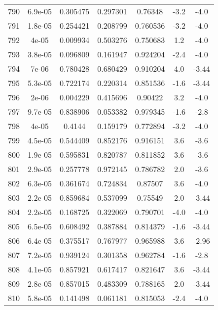 \begin{table}
\begin{tabular}{c|c|c|c|c|c|c}
790 & 6.9e-05 & 0.305475 & 0.297301 & 0.76348 & -3.2 & -4.0\\
791 & 1.8e-05 & 0.254421 & 0.208799 & 0.760536 & -3.2 & -4.0\\
792 & 4e-05 & 0.009934 & 0.503276 & 0.750683 & 1.2 & -4.0\\
793 & 3.8e-05 & 0.096809 & 0.161947 & 0.924204 & -2.4 & -4.0\\
794 & 7e-06 & 0.780428 & 0.680429 & 0.910204 & 4.0 & -3.44\\
795 & 5.3e-05 & 0.722174 & 0.220314 & 0.851536 & -1.6 & -3.44\\
796 & 2e-06 & 0.004229 & 0.415696 & 0.90422 & 3.2 & -4.0\\
797 & 9.7e-05 & 0.838906 & 0.053382 & 0.979345 & -1.6 & -2.8\\
798 & 4e-05 & 0.4144 & 0.159179 & 0.772894 & -3.2 & -4.0\\
799 & 4.5e-05 & 0.544409 & 0.852176 & 0.916151 & 3.6 & -3.6\\
800 & 1.9e-05 & 0.595831 & 0.820787 & 0.811852 & 3.6 & -3.6\\
801 & 2.9e-05 & 0.257778 & 0.972145 & 0.786782 & 2.0 & -3.6\\
802 & 6.3e-05 & 0.361674 & 0.724834 & 0.87507 & 3.6 & -4.0\\
803 & 2.2e-05 & 0.859684 & 0.537099 & 0.75549 & 2.0 & -3.44\\
804 & 2.2e-05 & 0.168725 & 0.322069 & 0.790701 & -4.0 & -4.0\\
805 & 6.5e-05 & 0.608492 & 0.387884 & 0.814379 & -1.6 & -3.44\\
806 & 6.4e-05 & 0.375517 & 0.767977 & 0.965988 & 3.6 & -2.96\\
807 & 7.2e-05 & 0.939124 & 0.301358 & 0.962784 & -1.6 & -2.8\\
808 & 4.1e-05 & 0.857921 & 0.617417 & 0.821647 & 3.6 & -3.44\\
809 & 2.8e-05 & 0.857015 & 0.483309 & 0.788165 & 2.0 & -3.44\\
810 & 5.8e-05 & 0.141498 & 0.061181 & 0.815053 & -2.4 & -4.0\\
\end{tabular}
\end{table}
\newpage
